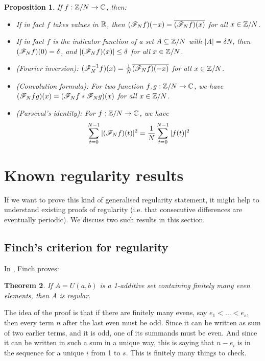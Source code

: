 \documentclass{report}
\newtheorem{theorem}{Theorem}[section]
\newtheorem{proposition}[theorem]{Proposition}
\theoremstyle{remark}
\numberwithin{equation}{section}
\begin{document}
\begin{proposition}
If $f : \mathbb{Z}/N \to \mathbb{C}$, then: 

\begin{itemize}
\item If in fact $f$ takes values in $\mathbb{R}$, then
  $(\mathscr{F}_N f)(-x) = \overline{(\mathscr{F}_N f)(x)}$ for all $x \in \mathbb{Z}/N$.

\item If in fact $f$ is the indicator function of a set
  $A \subseteq \mathbb{Z}/N$ with $|A| = \delta N$, then
  $(\mathscr{F}_N f)(0) = \delta$, and $|(\mathscr{F}_N f)(x)| \leq \delta$ for all
  $x \in \mathbb{Z}/N$.

\item (Fourier inversion):
  $(\mathscr{F}_N^{-1} f)(x) = \frac{1}{N} \overline{(\mathscr{F}_N f)(-x)}$ for all
  $x \in \mathbb{Z}/N$.

\item (Convolution formula): For two function $f, g : \mathbb{Z}/N \to \mathbb{C}$, we
  have $(\mathscr{F}_N fg)(x) = (\mathscr{F}_N f \ast \mathscr{F}_N g)(x)$ for all
  $x \in \mathbb{Z}/N$.

\item (Parseval's identity): For $f : \mathbb{Z}/N \to \mathbb{C}$, we
  have
  \[\sum_{t=0}^{N-1} |(\mathscr{F}_N f)(t)|^2 = \frac{1}{N} \sum_{t=0}^{N-1}
    |f(t)|^2\]
\end{itemize}
\end{proposition}

\section{Known regularity results}

If we want to prove this kind of generalised regularity statement, it
might help to understand existing proofs of regularity (i.e. that
consecutive differences are eventually periodic).  We discuss two such
results in this section.

\subsection{Finch's criterion for regularity}

In \cite{finch:em1992}, Finch proves:

\begin{theorem}
If $A = U(a,b)$ is a 1-additive set containing finitely many even
elements, then $A$ is regular.  
\end{theorem}

The idea of the proof is that if there are finitely many evens, say
$e_1 < \ldots < e_s$, then every term $n$ after the last even must be
odd.  Since it can be written as sum of two earlier terms, and it is
odd, one of its summands must be even.  And since it can be written in
such a sum in a unique way, this is saying that $n - e_i$ is in the
sequence for a unique $i$ from 1 to $s$.  This is finitely many things
to check.
\end{document}
